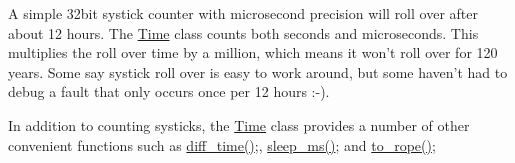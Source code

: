 A simple 32bit systick counter with microsecond precision will roll over after about 12 hours. The \hyperlink{classetk_1_1_time}{Time} class counts both seconds and microseconds. This multiplies the roll over time by a million, which means it won't roll over for 120 years. Some say systick roll over is easy to work around, but some haven't had to debug a fault that only occurs once per 12 hours \-:-\/).

In addition to counting systicks, the \hyperlink{classetk_1_1_time}{Time} class provides a number of other convenient functions such as \hyperlink{classetk_1_1_time_a3dc63bf57c12403aeebb9e22e8578c73}{diff\-\_\-time()};, \hyperlink{classetk_1_1_time_a166f875a8ceb4e5f47ad5bc274f2d668}{sleep\-\_\-ms()}; and \hyperlink{classetk_1_1_time_af0fabd9a7c37abd196d6c4ea480c7aa4}{to\-\_\-rope()}; 

